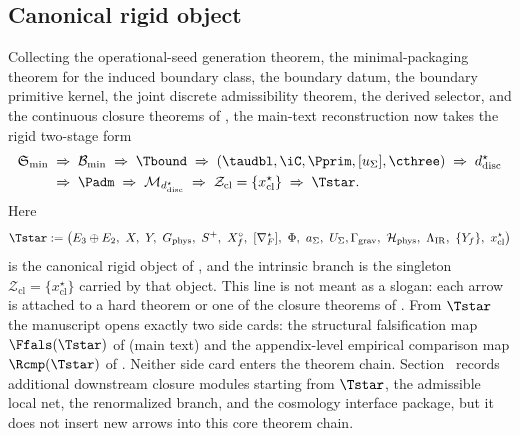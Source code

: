 \subsection{Canonical rigid object}

Collecting the operational-seed generation theorem, the minimal-packaging theorem for the induced
boundary class, the boundary datum, the
boundary primitive kernel, the joint discrete admissibility theorem, the derived selector, and the continuous closure
theorems of
, the main-text reconstruction now takes the rigid two-stage form
\begin{equation}
\label{eq:closed-output-chain}
\begin{aligned}
\mathfrak S_{\min}
&\;\Rightarrow\;
\mathcal B_{\min}
\;\Rightarrow\;
\Tbound
\;\Rightarrow\;
(\taudbl,\iC,\Pprim,[u_\Sigma],\cthree)
\;\Rightarrow\;
d^\star_{\mathrm{disc}}
\\
&\;\Rightarrow\;
\Padm
\;\Rightarrow\;
\mathcal M_{d^\star_{\mathrm{disc}}}
\;\Rightarrow\;
\mathcal Z_{\mathrm{cl}}=\{x^\star_{\mathrm{cl}}\}
\;\Rightarrow\;
\Tstar.
\end{aligned}
\end{equation}
Here
\[
\Tstar
:=
\bigl(
E_3\oplus E_2,\ X,\ Y,\ G_{\mathrm{phys}},\ S^+,\ X_f^\circ,\ [\nabla_F^\star],\ \Phi,\ a_\Sigma,\ U_\Sigma,\\
\Gamma_{\mathrm{grav}},\ \mathcal H_{\mathrm{phys}},\ \Lambda_{\mathrm{IR}},\ \{Y_f\},\ x_{\mathrm{cl}}^\star
\bigr)
\]
is the canonical rigid object of , and the intrinsic branch is
the singleton $\mathcal Z_{\mathrm{cl}}=\{x_{\mathrm{cl}}^\star\}$ carried by that object.
This line is not meant as a slogan: each arrow is attached to a hard theorem or one of the
closure theorems of . From $\Tstar$ the manuscript opens exactly two
side cards: the structural falsification map $\Ffals(\Tstar)$ of
 (main text) and the appendix-level empirical comparison
map $\Rcmp(\Tstar)$ of . Neither side card enters the
theorem chain.
Section~ records additional downstream closure modules starting
from $\Tstar$, the admissible local net, the renormalized branch, and the cosmology interface
package, but it does not insert new arrows into this core theorem chain.

